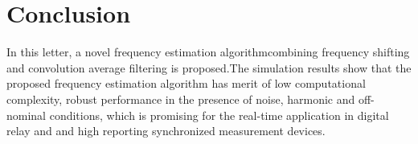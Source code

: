 \documentclass[journal,twoside]{IEEEtran}
\begin{document}
\section{Conclusion}
In this letter, a novel  frequency estimation algorithmcombining frequency shifting and convolution average filtering is proposed.The simulation results show that the proposed frequency estimation algorithm has merit of low computational complexity, robust performance in the presence of noise, harmonic and off-nominal conditions, which is promising for the real-time application in digital relay and and high reporting synchronized measurement devices.



\end{document}
